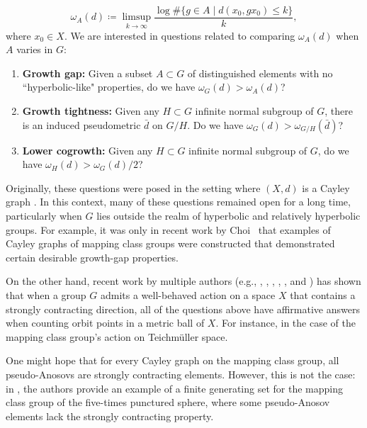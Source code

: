 \documentclass{amsart}
\numberwithin{thm}{section}
\numberwithin{figure}{section}
\theoremstyle{definition}
\theoremstyle{definition}
\theoremstyle{remark}
\numberwithin{equation}{section}
\theoremstyle{plain}
\begin{document}
\begin{equation} \omega_A(d) \coloneqq \limsup_{k \rightarrow \infty}\frac{\log \#\{g \in A \;\big|\;  d(x_0,gx_0) \leq k\}}{k},
\label{eq:criticalexp}
\end{equation}
where $x_0 \in X$. We are interested in questions related to comparing $\omega_{A}(d)$ when $A$ varies in $G$:

\begin{enumerate}
\item \textbf{Growth gap:} Given a subset $A \subset G$ of distinguished elements with no ``hyperbolic-like" properties, do we have $\omega_{G}(d) > \omega_A(d)$?
\vspace{1mm}
\item \textbf{Growth tightness:} Given any $H \subset G$ infinite normal subgroup of $G$, there is an induced pseudometric $\bar{d}$ on $G/H$. Do we have $\omega_{G}(d) > \omega_{G/H}(\bar{d})$?
\vspace{1mm}

\item \textbf{Lower cogrowth:} Given any $H \subset G$ infinite normal subgroup of $G$, do we have $\omega_{H}(d) > \omega_{G}(d)/2$?
\end{enumerate}

Originally, these questions were posed in the setting where $(X, d)$ is a Cayley graph \cite{growth_tight}. In this context, many of these questions remained open for a long time, particularly when $G$ lies outside the realm of hyperbolic and relatively hyperbolic groups. For example, it was only in recent work by Choi~\cite{Choi2021PseudoAnosovsAE} that examples of Cayley graphs of mapping class groups were constructed that demonstrated certain desirable growth-gap properties.

On the other hand, recent work by multiple authors (e.g., \cite{Yang2018}, \cite{Yang17:ConvexCocompact}, \cite{Yan14:GrowthTight}, \cite{COULON2024}, \cite{CGZ24:Confined}, and \cite{Arzhantseva2015}) has shown that when a group $G$ admits a well-behaved action on a space $X$ that contains a strongly contracting direction, all of the questions above have affirmative answers when counting orbit points in a metric ball of $X$. For instance, in the case of the mapping class group's action on Teichmüller space.

One might hope that for every Cayley graph on the mapping class group, all pseudo-Anosovs are strongly contracting elements. However, this is not the case: in \cite{Rafi2021}, the authors provide an example of a finite generating set for the mapping class group of the five-times punctured sphere, where some pseudo-Anosov elements lack the strongly contracting property. 
\end{document}
